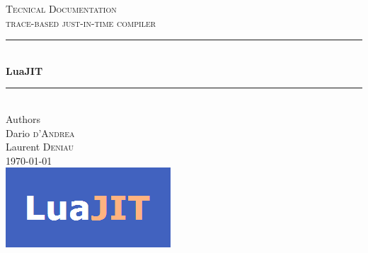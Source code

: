 \begin{titlepage}

\newcommand{\HRule}{\rule{\linewidth}{0.5mm}} %

\center 

\textsc{\Large Tecnical Documentation}\\[0.5cm] %
\textsc{\large trace-based just-in-time compiler}\\[0.5cm] %

\HRule \\[0.7cm]
{ \huge \bfseries LuaJIT}\\[0.3cm] %
\HRule \\[1.5cm]
 




\Large Authors\\
Dario \textsc{d'Andrea}\\
Laurent \textsc{Deniau}\\[2cm] %


{\large \today}\\[2cm] %

\includegraphics{luajit/images/title/logo-luajit.png}\\[1cm] 

\vfill 

\end{titlepage}